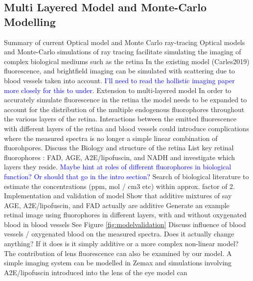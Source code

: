 \documentclass{optica-article}
\begin{document}
\subsection{Multi Layered Model and Monte-Carlo Modelling}
\begin{outline}
\1 Summary of current Optical model and Monte Carlo ray-tracing
    \2 Optical models and Monte-Carlo simulations of ray tracing facilitate simulating the imaging of complex biological mediums such as the retina
    \2 In the existing model (Carles2019) fluorescence, and brightfield imaging can be simulated with scattering due to blood vessels taken into account.
    \2 \textcolor{blue}{I'll need to read the hollistic imaging paper more closely for this to under.}
\1 Extension to multi-layered model
    \2 In order to accurately simulate fluorescence in the retina the model needs to be expanded to account for the distribution of the multiple endogenous fluorophores throughout the various layers of the retina. 
    \2 Interactions between the emitted fluorescence with different layers of the retina and blood vessels could introduce complications where the measured spectra is no longer a simple linear combination of fluorohpores.
    \2 Discuss the Biology and structure of the retina
        \3  List key retinal fluorophores : FAD, AGE, A2E/lipofuscin, and NADH  and investigate which layers they reside. \textcolor{blue}{Maybe hint at roles of different fluorophores in biological function? Or should that go in the intro section?}
        \3 Search of biological literature to estimate the concentrations (ppm, mol / cm3 etc) within approx. factor of 2. 
\1 Implementation and validation of model
    \2 Show that additive mixtures of say AGE, A2E/lipofuscin, and FAD actually are additive
    \2 Generate an example retinal image using fluorophores in different layers, with and without oxygenated blood in blood vessels
    \2 See Figure \ref{fig:modelvalidation}
    \2 Discuss influence of blood vessels / oxygenated blood on the measured spectra. Does it actually change anything? If it does is it simply additive or a more complex non-linear model?
    \2 The contribution of lens fluorescence can also be examined by our model. A simple imaging system can be modelled in Zemax and simulations involving A2E/lipofuscin introduced into the lens of the eye model can
\end{outline}
\end{document}
